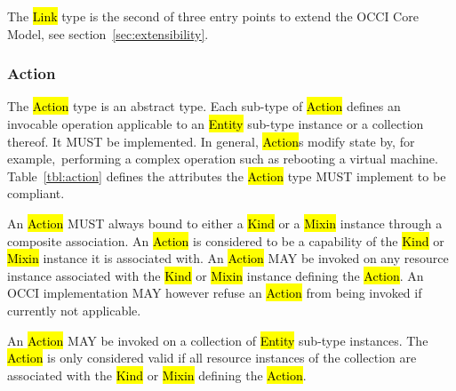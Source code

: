 \documentclass[10pt,a4paper]{article}
\begin{document}
The \hl{Link} type is the second of three entry points to extend the OCCI Core
Model, see section~\ref{sec:extensibility}.

\subsubsection{Action}
The \hl{Action} type is an abstract type. Each sub-type of \hl{Action} defines
an invocable operation applicable to an \hl{Entity}
sub-type instance or a collection thereof. It MUST be implemented. In general,
\hl{Action}s modify state by, for example,~performing a complex operation such as
rebooting a virtual machine.
%
Table~\ref{tbl:action} defines the attributes the \hl{Action} type MUST
implement to be compliant.


An \hl{Action} MUST always bound to either a \hl{Kind} or a \hl{Mixin} instance
through a composite association. An \hl{Action} is considered to be a
capability of the \hl{Kind} or \hl{Mixin} instance it is associated with.  An
\hl{Action} MAY be invoked on any resource instance associated with the
\hl{Kind} or \hl{Mixin} instance defining the \hl{Action}. An OCCI
implementation MAY however refuse an \hl{Action} from being invoked if
currently not applicable.

An \hl{Action} MAY be invoked on a collection of \hl{Entity} sub-type
instances. The \hl{Action} is only considered valid if all resource instances
of the collection are associated with the \hl{Kind} or \hl{Mixin} defining the
\hl{Action}.
\end{document}
